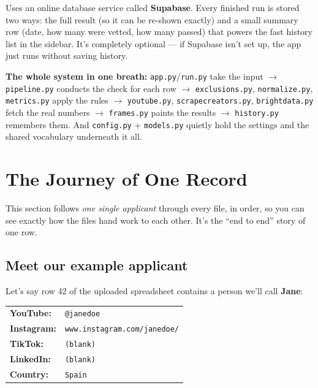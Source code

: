 \documentclass[11pt]{article}
\newcommand{\term}[1]{\textbf{\color{brandpurple}#1}}
\newcommand{\file}[1]{\texttt{\color{inkdark}#1}}
\begin{document}
Uses an online database service called \term{Supabase}. Every finished run is
stored two ways: the full result (so it can be re-shown exactly) and a small
summary row (date, how many were vetted, how many passed) that powers the fast
history list in the sidebar. It's completely optional — if Supabase isn't set
up, the app just runs without saving history.

\begin{plainbox}
\textbf{The whole system in one breath:} \file{app.py}/\file{run.py} take the
input $\rightarrow$ \file{pipeline.py} conducts the check for each row
$\rightarrow$ \file{exclusions.py}, \file{normalize.py}, \file{metrics.py} apply
the rules $\rightarrow$ \file{youtube.py}, \file{scrapecreators.py},
\file{brightdata.py} fetch the real numbers $\rightarrow$ \file{frames.py}
paints the results $\rightarrow$ \file{history.py} remembers them. And
\file{config.py} + \file{models.py} quietly hold the settings and the shared
vocabulary underneath it all.
\end{plainbox}

\newpage

\section{The Journey of One Record}

This section follows \emph{one single applicant} through every file, in order,
so you can see exactly how the files hand work to each other. It's the ``end to
end'' story of one row.

\subsection{Meet our example applicant}

Let's say row 42 of the uploaded spreadsheet contains a person we'll call
\textbf{Jane}:

\begin{plainbox}
\begin{tabular}{ll}
\textbf{YouTube:} & \texttt{@janedoe} \\
\textbf{Instagram:} & \texttt{www.instagram.com/janedoe/} \\
\textbf{TikTok:} & \texttt{(blank)} \\
\textbf{LinkedIn:} & \texttt{(blank)} \\
\textbf{Country:} & \texttt{Spain} \\
\end{tabular}
\end{plainbox}
\end{document}
